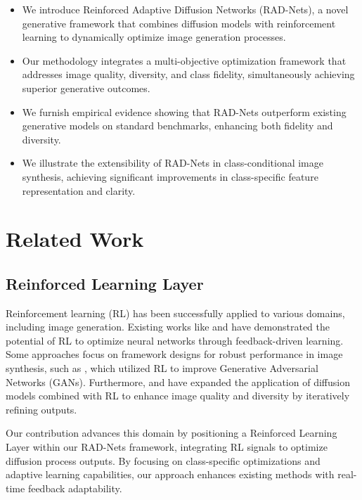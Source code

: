 \documentclass{article} %
\begin{document}
\begin{itemize}
    \item We introduce Reinforced Adaptive Diffusion Networks (RAD-Nets), a novel generative framework that combines diffusion models with reinforcement learning to dynamically optimize image generation processes.
    \item Our methodology integrates a multi-objective optimization framework that addresses image quality, diversity, and class fidelity, simultaneously achieving superior generative outcomes.
    \item We furnish empirical evidence showing that RAD-Nets outperform existing generative models on standard benchmarks, enhancing both fidelity and diversity.
    \item We illustrate the extensibility of RAD-Nets in class-conditional image synthesis, achieving significant improvements in class-specific feature representation and clarity.
\end{itemize}



\section{Related Work}

\subsection{Reinforced Learning Layer}

Reinforcement learning (RL) has been successfully applied to various domains, including image generation. Existing works like \citep{lillicrap2015continuous} and \citep{mnih2016asynchronous} have demonstrated the potential of RL to optimize neural networks through feedback-driven learning. Some approaches focus on framework designs for robust performance in image synthesis, such as \citep{wang2019reinforced}, which utilized RL to improve Generative Adversarial Networks (GANs). Furthermore, \citep{song2020score} and \citep{ho2020denoising} have expanded the application of diffusion models combined with RL to enhance image quality and diversity by iteratively refining outputs. 

Our contribution advances this domain by positioning a Reinforced Learning Layer within our RAD-Nets framework, integrating RL signals to optimize diffusion process outputs. By focusing on class-specific optimizations and adaptive learning capabilities, our approach enhances existing methods with real-time feedback adaptability.
\end{document}
